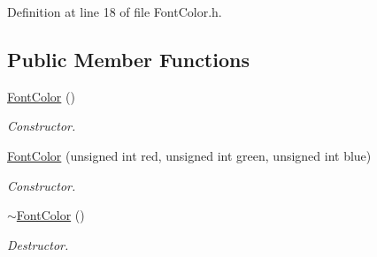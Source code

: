 Definition at line 18 of file FontColor.h.\subsection*{Public Member Functions}
\begin{CompactItemize}
\item 
\hyperlink{struct_font_color_c96e70b5ab153ea18d1e3196f79da1ab}{FontColor} ()
\begin{CompactList}\small\item\em Constructor. \item\end{CompactList}\item 
\hyperlink{struct_font_color_6db5f801f533eb648881ba1fdd1f1b84}{FontColor} (unsigned int red, unsigned int green, unsigned int blue)
\begin{CompactList}\small\item\em Constructor. \item\end{CompactList}\item 
\hyperlink{struct_font_color_660917a7d04fdf47910573165f67cdaa}{$\sim$FontColor} ()
\begin{CompactList}\small\item\em Destructor. \item\end{CompactList}\end{CompactItemize}
